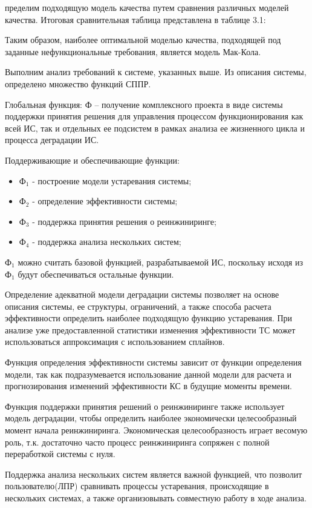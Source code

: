 пределим подходящую модель качества путем сравнения различных моделей качества. 
Итоговая сравнительная таблица представлена в таблице 3.1:

Таким образом, наиболее оптимальной моделью качества, подходящей под заданные нефункциональные требования, является модель Мак-Кола.

Выполним анализ требований к системе, указанных выше. 
Из описания системы, определено множество функций СППР.

Глобальная функция: $Ф$ – получение комплексного проекта в виде системы поддержки принятия решения для управления процессом функционирования как всей ИС, так и отдельных ее подсистем в рамках анализа ее жизненного цикла и процесса деградации ИС. 

Поддерживающие и обеспечивающие функции:
\begin{itemize}
    \item $Ф_1$ - построение модели устаревания системы;
    \item $Ф_2$ - определение эффективности системы;
    \item $Ф_3$ - поддержка принятия решения о реинжиниринге;
    \item $Ф_4$ - поддержка анализа нескольких систем;
\end{itemize}

$Ф_1$ можно считать базовой функцией, разрабатываемой ИС, поскольку исходя из $Ф_1$ будут обеспечиваться остальные функции.

Определение адекватной модели деградации системы позволяет на основе описания системы, ее структуры, ограничений, а также способа расчета эффективности определить наиболее подходящую функцию устаревания. 
При анализе уже предоставленной статистики изменения эффективности ТС может использоваться аппроксимация с использованием сплайнов.

Функция определения эффективности системы зависит от функции определения модели, так как подразумевается использование данной модели для расчета и прогнозирования изменений эффективности КС в будущие моменты времени.

Функция поддержки принятия решений о реинжиниринге также использует модель деградации, чтобы определить наиболее экономически целесообразный момент начала реинжиниринга. 
Экономическая целесообразность играет весомую роль, т.к. достаточно часто процесс реинжиниринга сопряжен с полной переработкой системы с нуля.

Поддержка анализа нескольких систем является важной функцией, что позволит пользователю(ЛПР) сравнивать процессы устаревания, происходящие в нескольких системах, а также организовывать совместную работу в ходе анализа.


